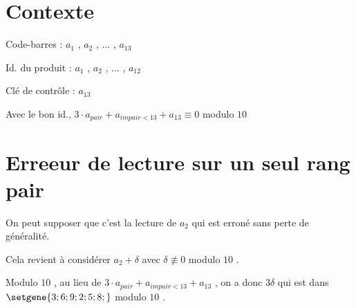 \documentclass[a4paper, 12pt]{scrartcl}
\begin{document}
\section*{Contexte}

Code-barres : $a_1$ , $a_2$ , ... , $a_13$

Id. du produit : $a_1$ , $a_2$ , ... , $a_12$
 
Clé de contrôle : $a_13$
 
Avec le bon id., 
$3 \cdot a_{pair} + a_{impair < 13} + a_{13} \equiv 0$ modulo $10$


\section*{Erreeur de lecture sur un seul rang pair}

On peut supposer que c'est la lecture de $a_2$ qui est erroné sans perte de généralité.

Cela revient à considérer $a_2 + \delta$ avec $\delta \nequiv 0$ modulo $10$ .

Modulo $10$ , au lieu de $3 \cdot a_{pair} + a_{impair < 13} + a_{13}$ , on a donc $3 \delta$ qui est dans $\setgene{3 ; 6 ; 9 ; 2 ; 5 ; 8 ; }$ modulo $10$ .
\end{document}
